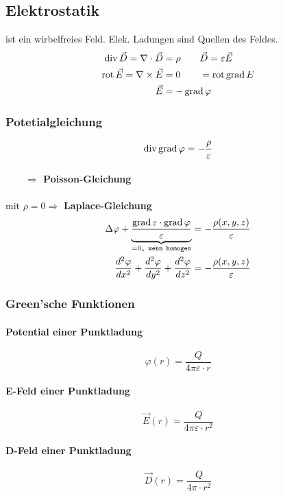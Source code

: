 \subsection{Elektrostatik}
ist ein wirbelfreies Feld. Elek. Ladungen sind Quellen des Feldes.
\begin{align*}
    \operatorname{div} \vec{D} = \nabla \cdot \vec{D}  & = \rho       \qquad          \vec{D} = \varepsilon \vec{E} \\
    \operatorname{rot} \vec{E} = \nabla \times \vec{E} & = 0          \qquad          = \operatorname{rot} \operatorname{grad} E            \\
    \vec{E}                                & =- \operatorname{grad} \varphi
\end{align*}
\subsubsection{Potetialgleichung}
\[
    \operatorname{div} \operatorname{grad} \varphi = - \dfrac{\rho}{\varepsilon}
\]
\paragraph{$\qquad \Rightarrow$ Poisson-Gleichung}
mit $\rho = 0 \Rightarrow$ \textbf{Laplace-Gleichung}
\begin{align*}
    \Delta \varphi + \underbrace{ \dfrac{\operatorname{grad} \varepsilon \cdot \operatorname{grad} \varphi}{\varepsilon}}_{= 0\texttt{, wenn homogen}}
     & = - \dfrac{\rho (x, y, z)}{\varepsilon} \\
    \frac{d^2 \varphi}{d x^2} + \frac{d^2 \varphi}{d y^2} + \frac{d^2 \varphi}{d z^2}
     & = - \dfrac{\rho (x, y, z)}{\varepsilon}
\end{align*}

\subsubsection{Green'sche Funktionen}
\paragraph*{Potential einer Punktladung}
\[ \varphi (r) = \dfrac{Q}{4 \pi \varepsilon \cdot r}\]

\paragraph*{E-Feld einer Punktladung}
\[ \vec{E}(r) = \dfrac{Q}{4 \pi \varepsilon \cdot r^2}\]

\paragraph*{D-Feld einer Punktladung}
\[ \vec{D}(r) = \dfrac{Q}{4 \pi \cdot r^2}\]

